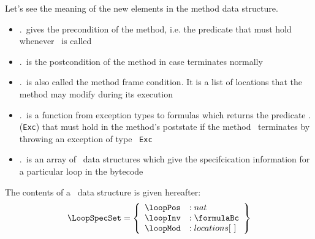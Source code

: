 Let's see the meaning of the new elements in the method data structure.
\begin{itemize}
     \item \methodd.\pre \ gives the precondition of the method, i.e. the predicate that must hold
           whenever \methodd \  is called
     \item \methodd.\normalPost \ is the postcondition of the method in case \methodd terminates normally  
     
     \item \methodd.\modif \ is also called the method frame condition. It is a list of locations that the method
            may modify during its execution    
     
     \item \methodd.\excPostSpec \ is a function from exception types to formulas which returns the predicate
           \methodd.\excPostSpec(\texttt{Exc})  that must hold in the method's poststate 
	   if the method \methodd \ terminates by throwing an exception of type \mbox{ \rm \texttt{Exc}} 
     \item \methodd.\loopSpecTable \ is an array of \LoopSpecSet \ data structures which give the specifcication information 
           for a particular loop in the bytecode         
\end{itemize}

 
The contents of a \LoopSpecSet \ data structure is given hereafter:
$$ \begin{array}{l}
      \LoopSpecSet = \left\{\begin{array}{ll}  
                                       \loopPos   & : nat \\
                                       \loopInv   & : \formulaBc \\                 
	                               \loopMod   & : locations\lbrack \ \rbrack  
                            \end{array}  \right\} 
     \end{array} $$ 


